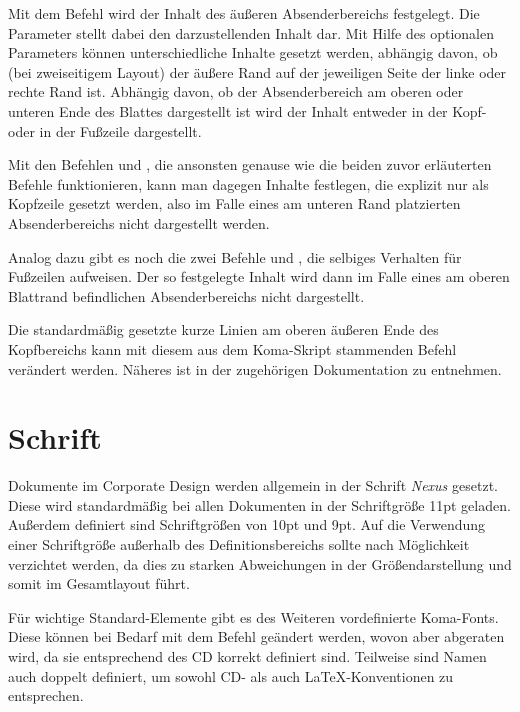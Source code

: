 Mit dem Befehl 
wird der Inhalt des äußeren Absenderbereichs festgelegt.
Die Parameter  stellt dabei den darzustellenden Inhalt dar.
Mit Hilfe des optionalen Parameters  können unterschiedliche
Inhalte gesetzt werden, abhängig davon, ob (bei zweiseitigem Layout)
der äußere Rand auf der jeweiligen Seite der linke oder rechte Rand ist.
Abhängig davon, ob der Absenderbereich am oberen oder unteren Ende des Blattes
dargestellt ist wird der Inhalt entweder in der Kopf- oder in der Fußzeile
dargestellt.

Mit den Befehlen  und , die ansonsten genause
wie die beiden zuvor erläuterten Befehle funktionieren, kann man dagegen
Inhalte festlegen, die explizit nur als Kopfzeile gesetzt werden, also
im Falle eines am unteren Rand platzierten Absenderbereichs nicht dargestellt 
werden.

Analog dazu gibt es noch die zwei Befehle 
und , die selbiges Verhalten für Fußzeilen aufweisen.
Der so festgelegte Inhalt wird dann im Falle eines am oberen Blattrand
befindlichen Absenderbereichs nicht dargestellt.

\begin{Declaration}
\end{Declaration}


Die standardmäßig gesetzte kurze Linien am oberen äußeren Ende des
Kopfbereichs kann mit diesem aus dem Koma-Skript stammenden Befehl verändert
werden. Näheres ist in der zugehörigen Dokumentation zu
entnehmen\cite{koma-skript}.


\section{Schrift}


Dokumente im Corporate Design werden allgemein in der Schrift \emph{Nexus}
gesetzt. Diese wird standardmäßig bei allen Dokumenten in der Schriftgröße
11pt geladen. Außerdem definiert sind Schriftgrößen von 10pt und 9pt.
Auf die Verwendung einer Schriftgröße außerhalb des Definitionsbereichs sollte
nach Möglichkeit verzichtet werden, da dies zu starken Abweichungen in der
Größendarstellung und somit im Gesamtlayout führt.


Für wichtige Standard-Elemente gibt es des Weiteren vordefinierte Koma-Fonts.
Diese können bei Bedarf mit dem Befehl  
geändert werden, wovon aber abgeraten wird, da sie entsprechend des CD korrekt
definiert sind. Teilweise sind Namen auch doppelt definiert, um sowohl
CD- als auch \LaTeX-Konventionen zu entsprechen.

